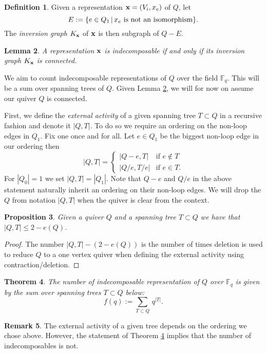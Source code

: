 \documentclass{amsart}
\newtheorem{thm}{Theorem}[section]
\newtheorem{lem}[thm]{Lemma}
\newtheorem{prop}[thm]{Proposition}
\theoremstyle{definition}
\newtheorem{defn}[thm]{Definition}
\newtheorem{rem}[thm]{Remark}
\begin{document}
\begin{defn}
Given a representation $\mathbf{x} = (V_i, x_e)$ of $Q$, let $$E:=\{e\in Q_1 \,|\, x_e \textup{ is not an isomorphism}\}.$$   The {\em inversion graph} $K_{\mathbf{x}}$ of $\mathbf{x}$ is then subgraph of $Q - E$.
\end{defn}

\begin{lem}\label{lm:coninvgr}
A representation $\mathbf{x}$ is indecomposable if and only if its inversion graph $K_{\mathbf{x}}$ is connected.
\end{lem}

We aim to count indecomposable representations of $Q$ over the field $\mathbb{F}_q$.
This will be a sum over spanning trees of $Q$.
Given Lemma \ref{lm:coninvgr}, we will for now on assume our quiver $Q$ is connected.

First, we define the {\em external activity} of a given spanning tree $T \subset Q$ in a recursive fashion and denote it $|Q,T|$.
To do so we require an ordering on the non-loop edges in $Q_1$.
Fix one once and for all.
Let $e \in Q_1$ be the biggest non-loop edge in our ordering then
$$|Q,T| = \begin{cases} |Q-e, T| & \text{if } e \notin T \\ |Q/e, T/e| & \text{if } e \in T.\end{cases}
$$
For $|Q_0| =1$ we set $|Q,T|=|Q_1|.$
Note that $Q-e$ and $Q/e$ in the above statement naturally inherit an ordering on their non-loop edges.
We will drop the $Q$ from notation $|Q,T|$ when the quiver is clear from the context.

\begin{prop}\label{prop:euler}
Given a quiver $Q$ and a spanning tree $T \subset Q$ we have that $|Q,T| \leq 2-e(Q)$.
\end{prop}

\begin{proof}
The number $|Q,T| - (2-e(Q))$ is the number of times deletion is used to reduce $Q$ to a one vertex quiver when defining the external activity using contraction/deletion.
\end{proof}

\begin{thm}\label{thm:numindecom}
The number of indecomposable representation of $Q$ over $\mathbb{F}_q$ is given by the sum over spanning trees $T \subset Q$ below: $$f(q):=\sum_{T\subset Q}\, q^{|T|}.$$
\end{thm}

\begin{rem}
The external activity of a given tree depends on the ordering we chose above. 
However, the statement of Theorem \ref{thm:numindecom} implies that the number of indecomposables is not.
\end{rem}
\end{document}
